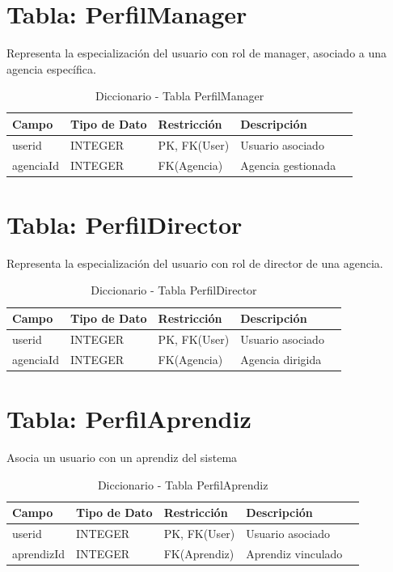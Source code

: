 \documentclass[12pt,a4paper,spanish,oneside]{report}
\begin{document}
\section{Tabla: PerfilManager}
Representa la especialización del usuario con rol de manager, asociado a una agencia
específica.
\begin{table}[H]
\centering
\caption{Diccionario - Tabla PerfilManager}
\begin{tabular}{|l|l|l|l|l|}
\hline
\textbf{Campo} & \textbf{Tipo de Dato} & \textbf{Restricción} & \textbf{Descripción} \\
\hline
userid & INTEGER & PK, FK(User)& Usuario asociado \\
\hline
agenciaId & INTEGER & FK(Agencia)& Agencia gestionada \\
\hline
\end{tabular}
\end{table}

\section{Tabla: PerfilDirector}
Representa la especialización del usuario con rol de director de una agencia.
\begin{table}[H]
\centering
\caption{Diccionario - Tabla PerfilDirector}
\begin{tabular}{|l|l|l|l|l|}
\hline
\textbf{Campo} & \textbf{Tipo de Dato} & \textbf{Restricción} & \textbf{Descripción} \\
\hline
userid & INTEGER & PK, FK(User)& Usuario asociado \\
\hline
agenciaId & INTEGER & FK(Agencia)& Agencia dirigida \\
\hline
\end{tabular}
\end{table}

\section{Tabla: PerfilAprendiz}
Asocia un usuario con un aprendiz del sistema
\begin{table}[H]
\centering
\caption{Diccionario - Tabla PerfilAprendiz}
\begin{tabular}{|l|l|l|l|l|}
\hline
\textbf{Campo} & \textbf{Tipo de Dato} & \textbf{Restricción} & \textbf{Descripción} \\
\hline
userid & INTEGER & PK, FK(User)& Usuario asociado \\
\hline
aprendizId & INTEGER & FK(Aprendiz)& Aprendiz vinculado \\
\hline
\end{tabular}
\end{table}
\end{document}

